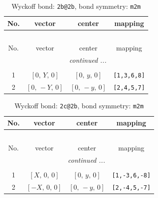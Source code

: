 \documentclass[fleqn,8pt]{jsarticle}
\begin{document}
\renewcommand{\arraystretch}{1.2}
\begin{longtable}{cccc}
\caption{Wyckoff bond: {\tt 2b@2b}, bond symmetry: {\tt m2m}}
 \\
 \hline \hline
No. & vector & center & mapping \\ \hline \endfirsthead

\multicolumn{3}{l}{\tablename\ \thetable{}} \\
 \hline \hline
No. & vector & center & mapping \\ \hline \endhead

 \hline \hline
\multicolumn{3}{r}{\footnotesize\it continued ...} \\ \endfoot

 \hline \hline
\multicolumn{3}{r}{} \\ \endlastfoot

1 & $\left[ 0,\, Y,\, 0 \right]$ & $\left[ 0,\, y,\, 0 \right]$ & {\tt [1,3,6,8]} \\ \hline
2 & $\left[ 0,\, - Y,\, 0 \right]$ & $\left[ 0,\, - y,\, 0 \right]$ & {\tt [2,4,5,7]} \\
\end{longtable}
\renewcommand{\arraystretch}{1.2}
\begin{longtable}{cccc}
\caption{Wyckoff bond: {\tt 2c@2b}, bond symmetry: {\tt m2m}}
 \\
 \hline \hline
No. & vector & center & mapping \\ \hline \endfirsthead

\multicolumn{3}{l}{\tablename\ \thetable{}} \\
 \hline \hline
No. & vector & center & mapping \\ \hline \endhead

 \hline \hline
\multicolumn{3}{r}{\footnotesize\it continued ...} \\ \endfoot

 \hline \hline
\multicolumn{3}{r}{} \\ \endlastfoot

1 & $\left[ X,\, 0,\, 0 \right]$ & $\left[ 0,\, y,\, 0 \right]$ & {\tt [1,-3,6,-8]} \\ \hline
2 & $\left[ - X,\, 0,\, 0 \right]$ & $\left[ 0,\, - y,\, 0 \right]$ & {\tt [2,-4,5,-7]} \\
\end{longtable}
\renewcommand{\arraystretch}{1.2}
\end{document}
